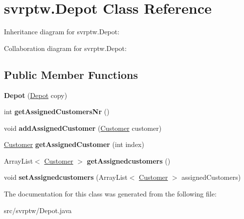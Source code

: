 \hypertarget{classsvrptw_1_1_depot}{}\section{svrptw.\+Depot Class Reference}
\label{classsvrptw_1_1_depot}


Inheritance diagram for svrptw.\+Depot\+:


Collaboration diagram for svrptw.\+Depot\+:
\subsection*{Public Member Functions}
\begin{DoxyCompactItemize}
\item 
{\bfseries Depot} (\hyperlink{classsvrptw_1_1_depot}{Depot} copy)\hypertarget{classsvrptw_1_1_depot_a2415feac0f0bff5bf63bf17af4341291}{}\label{classsvrptw_1_1_depot_a2415feac0f0bff5bf63bf17af4341291}

\item 
int {\bfseries get\+Assigned\+Customers\+Nr} ()\hypertarget{classsvrptw_1_1_depot_a1cc8ac9a1ae0a98ca5ef1db76804d94e}{}\label{classsvrptw_1_1_depot_a1cc8ac9a1ae0a98ca5ef1db76804d94e}

\item 
void {\bfseries add\+Assigned\+Customer} (\hyperlink{classsvrptw_1_1_customer}{Customer} customer)\hypertarget{classsvrptw_1_1_depot_a586765a5ee7be0d36198e6c5cadef029}{}\label{classsvrptw_1_1_depot_a586765a5ee7be0d36198e6c5cadef029}

\item 
\hyperlink{classsvrptw_1_1_customer}{Customer} {\bfseries get\+Assigned\+Customer} (int index)\hypertarget{classsvrptw_1_1_depot_ad91797be9732a89b153e4f5140e0a69b}{}\label{classsvrptw_1_1_depot_ad91797be9732a89b153e4f5140e0a69b}

\item 
Array\+List$<$ \hyperlink{classsvrptw_1_1_customer}{Customer} $>$ {\bfseries get\+Assignedcustomers} ()\hypertarget{classsvrptw_1_1_depot_a341d7b274d2f89b26286cb491a7e9c64}{}\label{classsvrptw_1_1_depot_a341d7b274d2f89b26286cb491a7e9c64}

\item 
void {\bfseries set\+Assignedcustomers} (Array\+List$<$ \hyperlink{classsvrptw_1_1_customer}{Customer} $>$ assigned\+Customers)\hypertarget{classsvrptw_1_1_depot_ad6807e206cd924b89b06c79334eda460}{}\label{classsvrptw_1_1_depot_ad6807e206cd924b89b06c79334eda460}

\end{DoxyCompactItemize}


The documentation for this class was generated from the following file\+:\begin{DoxyCompactItemize}
\item 
src/svrptw/Depot.\+java\end{DoxyCompactItemize}
